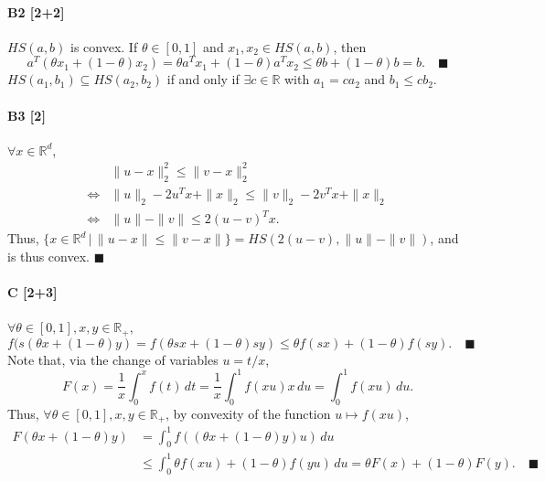 \documentclass[11pt]{article}
\newcommand{\qed}{\quad \ensuremath{\blacksquare}}      %
\newcommand{\R}{\mathbb{R}}                             %
\begin{document}
\paragraph{B2 [2+2]}
$HS(a,b)$ is convex. If $\theta \in [0,1]$ and $x_1,x_2 \in HS(a,b)$, then
\[a^T (\theta x_1 + (1 - \theta)x_2)
 = \theta a^Tx_1 + (1 - \theta)a^Tx_2
 \leq \theta b + (1 - \theta)b
 = b. \qed
\]
$HS(a_1,b_1) \subseteq HS(a_2,b_2)$ if and only if
$\exists c \in \R$ with $a_1 = ca_2$ and $b_1 \leq cb_2$.

\paragraph{B3 [2]} $\forall x \in \R^d$,
\vspace{-5mm}
\begin{align*}
                & \|u - x\|_2^2 \leq \|v - x\|_2^2 \\
\Leftrightarrow & \|u\|_2 - 2u^Tx + \|x\|_2 \leq \|v\|_2 - 2v^Tx + \|x\|_2 \\
\Leftrightarrow & \|u\| - \|v\| \leq 2(u - v)^Tx.
\end{align*}
Thus, $\{x \in \R^d \, | \, \|u - x\| \leq \|v - x\|\}
 = HS(2(u - v), \|u\| - \|v\|)$, and is thus convex. \qed

\paragraph{C [2+3]}
$\forall \theta \in [0,1], x,y \in \R_+$,
\[f(s(\theta x + (1 - \theta)y)
 = f(\theta sx + (1 - \theta)sy)
 \leq \theta f(sx) + (1 - \theta)f(sy). \qed
\]
Note that, via the change of variables $u = t/x$,
\[F(x)
 = \frac1x \int_0^x f(t) \, dt
 = \frac1x \int_0^1 f(xu) x \, du
 = \int_0^1 f(xu) \, du.
\]
Thus, $\forall \theta \in [0,1], x,y \in \R_+$, by convexity of the function
$u \mapsto f(xu)$,
\begin{align*}
F(\theta x + (1 - \theta)y)
 & = \int_0^1  f((\theta x + (1 - \theta)y)u) \, du \\
 & \leq \int_0^1  \theta f(xu) + (1 - \theta)f(yu) \, du
   = \theta F(x) + (1 - \theta) F(y). \qed
\end{align*}
\end{document}
